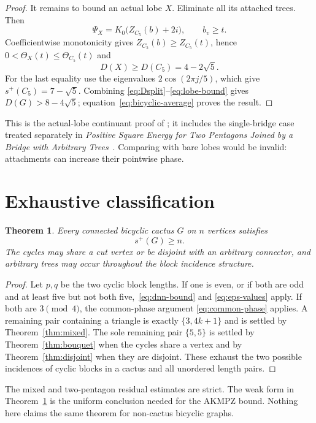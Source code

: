 \documentclass[11pt]{article}
\newtheorem{theorem}{Theorem}[section]
\theoremstyle{remark}
\begin{document}
\begin{proof}
It remains to bound an actual lobe $X$.  Eliminate all its attached trees.
Then
\[
 \Psi_X=K_0\bigl(Z_{C_5}(b)+2i\bigr),\qquad b_v\geq t.
\]
Coefficientwise monotonicity gives $Z_{C_5}(b)\geq Z_{C_5}(t)$, hence
$0<\Theta_X(t)\leq\Theta_{C_5}(t)$ and
\begin{equation}\label{eq:lobe-bound}
 D(X)\geq D(C_5)=4-2\sqrt5.
\end{equation}
For the last equality use the eigenvalues $2\cos(2\pi j/5)$, which give
$s^+(C_5)=7-\sqrt5$.  Combining
\eqref{eq:Dsplit}--\eqref{eq:lobe-bound} gives
$D(G)>8-4\sqrt5$; equation~\eqref{eq:bicyclic-average} proves the result.
\end{proof}

This is the actual-lobe continuant proof of
\cite{AllConnectors}; it includes the single-bridge case treated separately
in \emph{Positive Square Energy for Two Pentagons Joined by a Bridge with
Arbitrary Trees}~\cite{BridgeCompanion}.  Comparing with bare lobes would be
invalid: attachments can increase their pointwise phase.

\section{Exhaustive classification}

\begin{theorem}\label{thm:main}
Every connected bicyclic cactus $G$ on $n$ vertices satisfies
\[
 \boxed{s^+(G)\geq n}.
\]
The cycles may share a cut vertex or be disjoint with an arbitrary connector,
and arbitrary trees may occur throughout the block incidence structure.
\end{theorem}

\begin{proof}
Let $p,q$ be the two cyclic block lengths.  If one is even, or if both are odd
and at least five but not both five,~\eqref{eq:dnn-bound} and
\eqref{eq:eps-values} apply.  If both are $3\pmod4$, the common-phase argument
\eqref{eq:common-phase} applies.  A remaining pair containing a triangle is
exactly $\{3,4k+1\}$ and is settled by Theorem~\ref{thm:mixed}.  The sole
remaining pair $\{5,5\}$ is settled by Theorem~\ref{thm:bouquet} when the
cycles share a vertex and by Theorem~\ref{thm:disjoint} when they are
disjoint.  These exhaust the two possible incidences of cyclic blocks in a
cactus and all unordered length pairs.
\end{proof}

The mixed and two-pentagon residual estimates are strict.  The weak form in
Theorem~\ref{thm:main} is the uniform conclusion needed for the AKMPZ bound.
Nothing here claims the same theorem for non-cactus bicyclic graphs.
\end{document}
